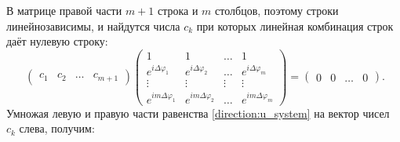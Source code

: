 В матрице правой части $m+1$ строка и $m$ столбцов, поэтому строки линейнозависимы, и найдутся числа $c_k$ при которых линейная комбинация строк даёт нулевую
строку:
\begin{equation}~\label{direction:c_zeroing}
    \begin{pmatrix}
        c_1 & c_2 & \dots & c_{m+1}
    \end{pmatrix}
    \begin{pmatrix}
        1                        & 1                        & \dots  & 1                        \\
        e^{i \Delta \varphi_1}   & e^{i \Delta \varphi_2}   & \dots  & e^{i \Delta \varphi_m}   \\
        \vdots                   & \vdots                   & \vdots & \vdots                   \\
        e^{i m \Delta \varphi_1} & e^{i m \Delta \varphi_2} & \dots  & e^{i m \Delta \varphi_m}
    \end{pmatrix}
    = \begin{pmatrix}
        0 & 0 & \dots & 0
    \end{pmatrix}
    .
\end{equation}
Умножая левую и правую части равенства \eqref{direction:u_system} на вектор чисел $c_k$ слева, получим:
